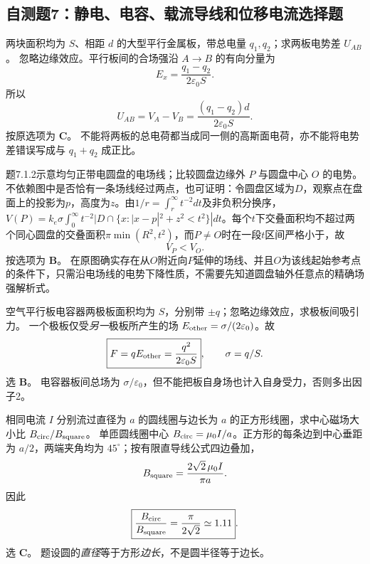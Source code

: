 
\subsection{自测题7：静电、电容、载流导线和位移电流选择题}

\problemtext 两块面积均为 $S$、相距 $d$ 的大型平行金属板，带总电量 $q_1,q_2$；求两板电势差 $U_{AB}$。
\workings 忽略边缘效应。平行板间的合场强沿 $A\to B$ 的有向分量为
\[E_x=\frac{q_1-q_2}{2\varepsilon_0 S}.\]
所以
\[\boxed{U_{AB}=V_A-V_B=\frac{(q_1-q_2)d}{2\varepsilon_0 S}}.\]
按原选项为 \textbf{C}。
\crosscheck 不能将两板的总电荷都当成同一侧的高斯面电荷，亦不能将电势差错误写成与 $q_1+q_2$ 成正比。

\problemtext 题7.1.2示意均匀正带电圆盘的电场线；比较圆盘边缘外 $P$ 与圆盘中心 $O$ 的电势。
\workings 不依赖图中是否恰有一条场线经过两点，也可证明：令圆盘区域为$D$，观察点在盘面上的投影为$p$，高度为$z$。由$1/r=\int_r^\infty t^{-2}dt$及非负积分换序，$V(P)=k_e\sigma\int_0^\infty t^{-2}|D\cap\{x:|x-p|^2+z^2<t^2\}|dt$。每个$t$下交叠面积均不超过两个同心圆盘的交叠面积$\pi\min(R^2,t^2)$，而$P\ne O$时在一段$t$区间严格小于，故
\[\boxed{V_P<V_O}.\]
按选项为 \textbf{B}。
\crosscheck 在原图确实存在从$O$附近向$P$延伸的场线、并且$O$为该线起始参考点的条件下，只需沿电场线的电势下降性质，不需要先知道圆盘轴外任意点的精确场强解析式。

\problemtext 空气平行板电容器两极板面积均为 $S$，分别带 $\pm q$；忽略边缘效应，求极板间吸引力。
\workings 一个极板仅受\emph{另一}极板所产生的场 $E_{\rm other}=\sigma/(2\varepsilon_0)$。故
\[\boxed{F=qE_{\rm other}=\frac{q^2}{2\varepsilon_0 S}},\qquad \sigma=q/S.\]
选 \textbf{B}。
\crosscheck 电容器板间总场为 $\sigma/\varepsilon_0$，但不能把板自身场也计入自身受力，否则多出因子2。

\problemtext 相同电流 $I$ 分别流过直径为 $a$ 的圆线圈与边长为 $a$ 的正方形线圈，求中心磁场大小比 $B_{\rm circ}/B_{\rm square}$。
\workings 单匝圆线圈中心 $B_{\rm circ}=\mu_0I/a$。正方形的每条边到中心垂距为 $a/2$，两端夹角均为 $45^\circ$；按有限直导线公式四边叠加，
\[B_{\rm square}=\frac{2\sqrt2\,\mu_0I}{\pi a}.\]
因此
\[\boxed{\frac{B_{\rm circ}}{B_{\rm square}}=\frac{\pi}{2\sqrt2}\simeq1.11}.\]
选 \textbf{C}。
\crosscheck 题设圆的\emph{直径}等于方形\emph{边长}，不是圆半径等于边长。

